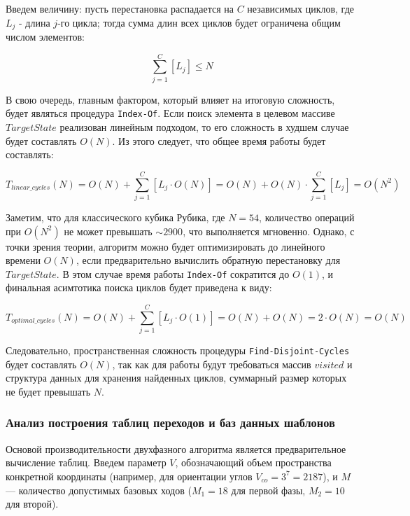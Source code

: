 \documentclass{article}
\begin{document}
Введем величину: пусть перестановка распадается на $C$ независимых циклов, где $L_j$ - длина $j$-го цикла; тогда сумма длин всех циклов будет ограничена общим числом элементов:

\begin{equation}
\sum_{j=1}^{C}\left[L_j\right]\le N    
\end{equation}

В свою очередь, главным фактором, который влияет на итоговую сложность, будет являться процедура \texttt{Index-Of}. Если поиск элемента в целевом массиве $TargetState$ реализован линейным подходом, то его сложность в худшем случае будет составлять $O(N)$. Из этого следует, что общее время работы будет составлять:

\begin{equation}
T_{linear\_cycles}(N) = O(N) + \sum_{j=1}^{C}\left[L_j\cdot O(N)\right] = O(N) + O(N) \cdot \sum_{j=1}^{C}\left[L_j\right] = O(N^2)
\end{equation}

Заметим, что для классического кубика Рубика, где $N=54$, количество операций при $O(N^2)$ не может превышать $\sim2900$, что выполняется мгновенно. Однако, с точки зрения теории, алгоритм можно будет оптимизировать до линейного времени $O(N)$, если предварительно вычислить обратную перестановку для $TargetState$. В этом случае время работы \texttt{Index-Of} сократится до $O(1)$, и финальная асимтотика поиска циклов будет приведена к виду:

\begin{equation}
T_{optimal\_cycles}(N) = O(N) + \sum_{j=1}^{C}\left[L_j\cdot O(1)\right] = O(N) + O(N) = 2\cdot O(N) = O(N)
\end{equation}

Следовательно, пространственная сложность процедуры \texttt{Find-Disjoint-Cycles} будет составлять $O(N)$, так как для работы будут требоваться массив $visited$ и структура данных для хранения найденных циклов, суммарный размер которых не будет превышать $N$.

\subsubsection{Анализ построения таблиц переходов и баз данных шаблонов}
Основой производительности двухфазного алгоритма является предварительное вычисление таблиц. Введем параметр $V$, обозначающий объем пространства конкретной координаты (например, для ориентации углов $V_{co} = 3^7 = 2187$), и $M$ — количество допустимых базовых ходов ($M_{1} = 18$ для первой фазы, $M_{2} = 10$ для второй).
\end{document}
